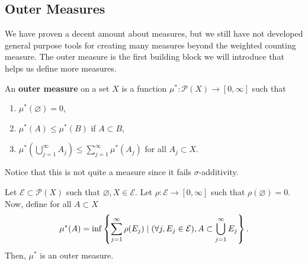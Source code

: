 \documentclass[11pt,leqno,oneside]{amsbook}
\numberwithin{thm}{section}
\renewcommand{\P}{\mathcal{P}} %
\newcommand{\Ep}{\mathcal{E}} %
\newcommand{\s}{$\sigma$-} %
\renewcommand{\emptyset}{\varnothing}
\renewcommand{\de}{\textbf} %
\begin{document}
\subsection{Outer Measures}
We have proven a decent amount about measures, but we still have not
developed general purpose tools for creating many measures beyond the
weighted counting measure. The outer measure is the first building
block we will introduce that helps us define more measures.
\begin{defn}
  An \de{outer measure} on a set $X$ is a function $\mu^* \colon \P(X)
  \to [0,\infty]$ such that
  \begin{enumerate}
  \item $\mu^*(\emptyset) = 0$,
  \item $\mu^*(A) \leq \mu^*(B)$ if $A \subset B$,
  \item $\mu^*(\bigcup_{j=1}^\infty A_j) \leq \sum_{j=1}^\infty
    \mu^*(A_j)$ for all $A_j \subset X$.
  \end{enumerate}
\end{defn}
Notice that this is not quite a measure since it fails
\s additivity.
\begin{thm}\label{outer-measure-space}
  Let $\Ep \subset \P(X)$ such that $\emptyset, X \in \Ep$. Let $\rho
  \colon \Ep \to [0,\infty]$ such that $\rho(\emptyset) = 0$. Now,
  define for all $A \subset X$ \[
    \mu^*(A) = \inf \left\{ \sum_{j=1}^\infty \rho(E_j) \st (\forall
      j, E_j \in \Ep), A \subset \bigcup_{j=1}^\infty E_j \right\}.
  \]
  Then, $\mu^*$ is an outer measure.
\end{thm}
\end{document}
